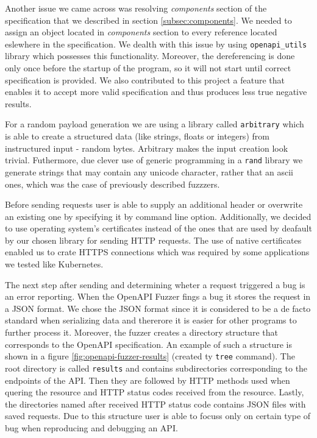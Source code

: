 Another issue we came across was resolving \textit{components} section of the specification that we described in section \ref{subsec:components}. We needed to assign an object located in \textit{components} section to every reference located eslewhere in the specification. We dealth with this issue by using \texttt{openapi\_utils} \cite{openapiutils2020github} library which possesses this functionality. Moreover, the dereferencing is done only once before the startup of the program, so it will not start until correct specification is provided. We also contributed to this project a feature that enables it to accept more valid specification and thus produces less true negative results.

For a random payload  generation we are using a library called \texttt{arbitrary} \cite{arbitrary2020github} which is able to create a structured data (like strings, floats or integers) from instructured input - random bytes. Arbitrary makes the input creation look trivial. Futhermore, due clever use of generic programming in a \texttt{rand} library \cite{rand2020github} we generate strings that may contain any unicode character, rather that an ascii ones, which was the case of previously described fuzzzers.

Before sending requests user is able to supply an additional header or overwrite an existing one by specifying it by command line option. Additionally, we decided to use operating system's certificates instead of the ones that are used by deafault by our chosen library for sending HTTP requests. The use of native certificates enabled us to crate HTTPS connections which was required by some applications we tested like Kubernetes.

The next step after sending and determining wheter a request triggered a bug is an error reporting. When the OpenAPI Fuzzer fings a bug it stores the request in a JSON format. We chose the JSON format since it is considered to be a de facto standard when serializing data and thererore it is easier for other programs to further process it. Moreover, the fuzzer creates a directory structure that corresponds to the OpenAPI specification. An example of such a structure is shown in a figure \ref{fig:openapi-fuzzer-results} (created ty \texttt{tree} command). The root directory is called \texttt{results} and contains subdirectories corresponding to the endpoints of the API. Then they are followed by HTTP methods used when quering the resource and HTTP status codes received from the resource. Lastly, the directories named after received HTTP status code contains JSON files with saved requests. Due to this structure user is able to focuss only on certain type of bug when reproducing and debugging an API.

